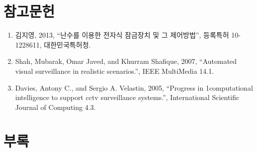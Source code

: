 \documentclass[11pt,a4paper]{article}
\begin{document}
\section{참고문헌}
\begin{enumerate}
\item 김지영, 2013, ``난수를 이용한 전자식 잠금장치 및 그 제어방법'', 등록특허 10-1228611, 대한민국특허청.
\item Shah, Mubarak, Omar Javed, and Khurram Shafique, 2007, ``Automated visual surveillance in realistic scenarios.'', IEEE MultiMedia 14.1.
\item Davies, Antony C., and Sergio A. Velastin, 2005, ``Progress in 1computational intelligence to support cctv surveillance systems.'', International Scientific Journal of Computing 4.3.
\end{enumerate}

\pagebreak
\section{부록}
\end{document}

